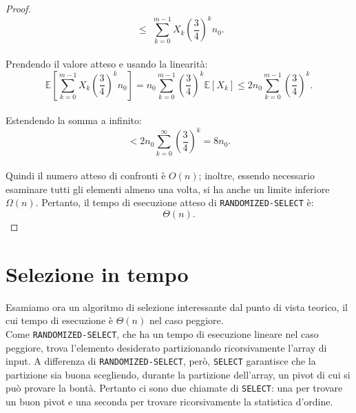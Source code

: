 \begin{proof}
\[\;\le\;
\sum_{k=0}^{m-1} X_k \left(\frac{3}{4}\right)^k n_0.
\]\\
Prendendo il valore atteso e usando la linearità:
\[
\mathbb{E}\!\left[\sum_{k=0}^{m-1} X_k \left(\frac{3}{4}\right)^k n_0 \right]
=
n_0 \sum_{k=0}^{m-1} \left(\frac{3}{4}\right)^k \mathbb{E}[X_k]
\le
2 n_0 \sum_{k=0}^{m-1} \left(\frac{3}{4}\right)^k.
\]\\
Estendendo la somma a infinito:
\[
< 2 n_0 \sum_{k=0}^{\infty} \left(\frac{3}{4}\right)^k
=
8 n_0.
\]\\
Quindi il numero atteso di confronti è $O(n)$; inoltre, essendo necessario esaminare tutti gli elementi almeno una volta, si ha anche un limite inferiore $\Omega(n)$. 
Pertanto, il tempo di esecuzione atteso di \texttt{RANDOMIZED-SELECT} è:
\[
\Theta(n).
\]
\end{proof}
\section{Selezione in tempo} 
Esamiamo ora un algoritmo di selezione interessante dal punto di vista teorico, il cui tempo di esecuzione è $\Theta(n)$ nel caso peggiore.\\
Come \texttt{RANDOMIZED-SELECT}, che ha un tempo di esecuzione lineare nel caso peggiore, trova l'elemento desiderato partizionando ricorsivamente l'array di input. A differenza di \texttt{RANDOMIZED-SELECT}, però, \texttt{SELECT} garantisce che la partizione sia buona scegliendo, durante la partizione dell'array, un pivot di cui si può provare la bontà. Pertanto ci sono due chiamate di \texttt{SELECT}: una per trovare un buon pivot e una seconda per trovare ricorsivamente la statistica d'ordine.\\
